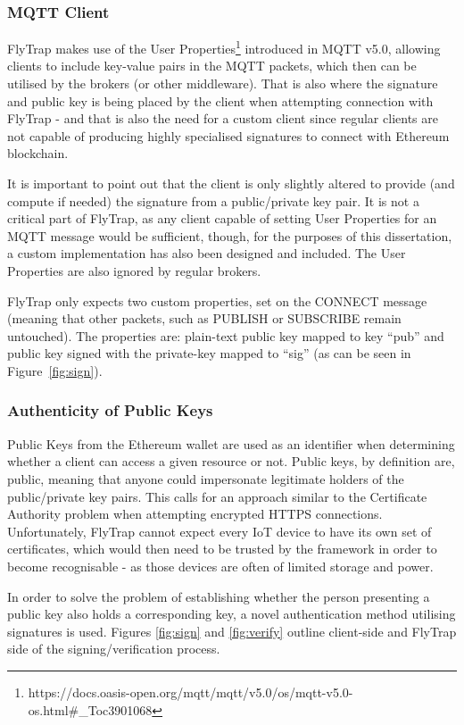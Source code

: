 \subsubsection{MQTT Client}
FlyTrap makes use of the User Properties\footnote{https://docs.oasis-open.org/mqtt/mqtt/v5.0/os/mqtt-v5.0-os.html\#\_Toc3901068} introduced in MQTT v5.0, allowing clients to include key-value pairs in the MQTT packets, which then can be utilised by the brokers (or other middleware). That is also where the signature and public key is being placed by the client when attempting connection with FlyTrap - and that is also the need for a custom client since regular clients are not capable of producing highly specialised signatures to connect with Ethereum blockchain.

It is important to point out that the client is only slightly altered to provide (and compute if needed) the signature from a public/private key pair. It is not a critical part of FlyTrap, as any client capable of setting User Properties for an MQTT message would be sufficient, though, for the purposes of this dissertation, a custom implementation has also been designed and included. The User Properties are also ignored by regular brokers.

FlyTrap only expects two custom properties, set on the CONNECT message (meaning that other packets, such as PUBLISH or SUBSCRIBE remain untouched). The properties are: plain-text public key mapped to key ``pub'' and public key signed with the private-key mapped to ``sig'' (as can be seen in Figure~\ref{fig:sign}).

\subsubsection{Authenticity of Public Keys}
Public Keys from the Ethereum wallet are used as an identifier when determining whether a client can access a given resource or not. Public keys, by definition are, public, meaning that anyone could impersonate legitimate holders of the public/private key pairs. This calls for an approach similar to the Certificate Authority problem when attempting encrypted HTTPS connections. Unfortunately, FlyTrap cannot expect every IoT device to have its own set of certificates, which would then need to be trusted by the framework in order to become recognisable - as those devices are often of limited storage and power.

In order to solve the problem of establishing whether the person presenting a public key also holds a corresponding key, a novel authentication method utilising signatures is used. Figures \ref{fig:sign} and \ref{fig:verify} outline client-side and FlyTrap side of the signing/verification process.

